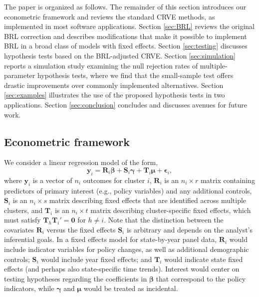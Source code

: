 \documentclass[12pt]{article}\usepackage[]{graphicx}\usepackage[]{color}
\newcommand{\bm}{\mathbf}
\newcommand{\bs}{\boldsymbol}
\begin{document}
The paper is organized as follows. The remainder of this section introduces our econometric framework and reviews the standard CRVE methods, as implemented in most software applications.
Section \ref{sec:BRL} reviews the original BRL correction and describes modifications that make it possible to implement BRL in a broad class of models with fixed effects.
Section \ref{sec:testing} discusses hypothesis tests based on the BRL-adjusted CRVE. 
Section \ref{sec:simulation} reports a simulation study examining the null rejection rates of multiple-parameter hypothesis tests, where we find that the small-sample test offers drastic improvements over commonly implemented alternatives. 
Section \ref{sec:examples} illustrates the use of the proposed hypothesis tests in two applications. 
Section \ref{sec:conclusion} concludes and discusses avenues for future work. 

\subsection{Econometric framework}

We consider a linear regression model of the form,
\begin{equation}
\label{eq:fixed_effects}
\bm{y}_i = \bm{R}_i \bs\beta + \bm{S}_i \bs\gamma + \bm{T}_i \bs\mu + \bs\epsilon_i,
\end{equation}
where $\bm{y}_i$ is a vector of $n_i$ outcomes for cluster $i$,  $\bm{R}_i$ is an $n_i \times r$ matrix containing predictors of primary interest (e.g., policy variables) and any additional controls, $\bm{S}_i$ is an $n_i \times s$ matrix describing fixed effects that are identified across multiple clusters, and $\bm{T}_i$ is an $n_i \times t$ matrix describing cluster-specific fixed effects, which must satisfy $\bm{T}_h \bm{T}_i' = \bm{0}$ for $h \neq i$.
Note that the distinction between the covariates $\bm{R}_i$ versus the fixed effects $\bm{S}_i$ is arbitrary and depends on the analyst's inferential goals.
In a fixed effects model for state-by-year panel data, $\bm{R}_i$ would include indicator variables for policy changes, as well as additional demographic controls; $\bm{S}_i$ would include year fixed effects; and $\bm{T}_i$ would indicate state fixed effects (and perhaps also state-specific time trends). 
Interest would center on testing hypotheses regarding the coefficients in $\bs\beta$ that correspond to the policy indicators, while $\bs\gamma$ and $\bs\mu$ would be treated as incidental. 
\end{document}
